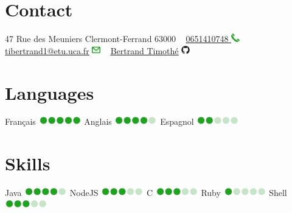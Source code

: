 \documentclass[]{cv-style}          %
\begin{document}
\newcommand{\Iconemail}{\includegraphics[width=1em]{email.png}}
\newcommand{\Icontel}{\includegraphics[width=1em]{tel.png}}
\newcommand{\Icongithub}{\includegraphics[width=1em]{github.png}}
\newcommand{\Iconone}{\includegraphics[width=5em]{1.png}}
\newcommand{\Icontwo}{\includegraphics[width=5em]{2.png}}
\newcommand{\Iconthree}{\includegraphics[width=5em]{3.png}}
\newcommand{\Iconfour}{\includegraphics[width=5em]{4.png}}
\newcommand{\Iconfive}{\includegraphics[width=5em]{5.png}}



\begin{aside}
%
\section{Contact}
47 Rue des Meuniers
Clermont-Ferrand
63000
~
\href{tel:+33 651410748}{0651410748 }\Icontel
~
\href{mailto:tibertrand1@etu.uca.fr}{\underline{tibertrand1@etu.uca.fr}} \Iconemail
~
\href{https://github.com/Fingarde}{\underline{Bertrand Timothé}} \Icongithub
~
\section{Languages}
Français
\Iconfive
Anglais
\Iconfour
Espagnol
\Icontwo
~
~
\section{Skills}
Java 
\Iconfour
NodeJS
\Iconthree
C
\Iconthree
Ruby
\Iconone
Shell
\Iconthree
%
\end{aside}
\end{document}
